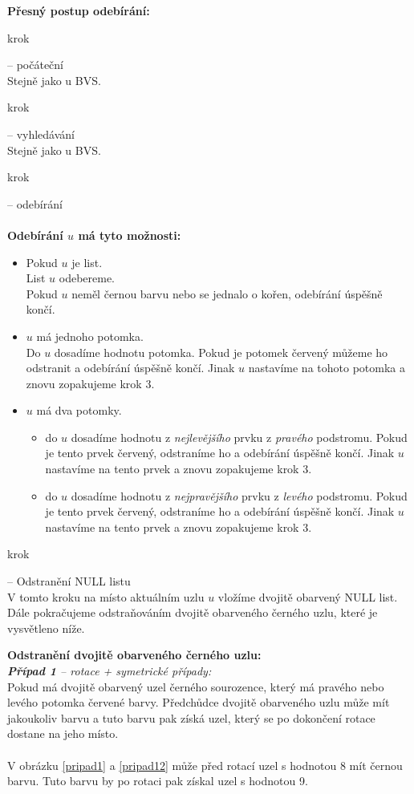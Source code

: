 \documentclass[
  biblatex=false,
  font=serif,
  glossaries=false,
  tables=false,
  theorems=false,
  index
]{kidiplom}
\begin{document}
\noindent \textbf{Přesný postup odebírání:}
\begin{enumerate} {\bfseries
\item  krok} -- počáteční \\
Stejně jako u BVS.
{\bfseries\item  krok} -- vyhledávání \\
Stejně jako u BVS.
{\bfseries\item  krok} -- odebírání \\\\
\textbf{Odebírání $u$ má tyto možnosti:}
\begin{itemize}
\item Pokud $u$ je list. \\
List $u$ odebereme.\\
Pokud $u$ neměl černou barvu nebo se jednalo o kořen, odebírání úspěšně končí.
\item $u$ má jednoho potomka. \\
Do $u$ dosadíme hodnotu potomka. Pokud je potomek červený můžeme ho odstranit a odebírání úspěšně končí. Jinak $u$ nastavíme na tohoto potomka a znovu zopakujeme krok 3.
\item $u$ má dva potomky. 
\begin{itemize}
\item do $u$ dosadíme hodnotu z \textit{nejlevějšího} prvku z \textit{pravého} podstromu. Pokud je tento prvek červený, odstraníme ho a odebírání úspěšně končí. Jinak $u$ nastavíme na tento prvek a znovu zopakujeme krok 3.
\item do $u$ dosadíme hodnotu z \textit{nejpravějšího} prvku z \textit{levého} podstromu. Pokud je tento prvek červený, odstraníme ho a odebírání úspěšně končí. Jinak $u$ nastavíme na tento prvek a znovu zopakujeme krok 3.
\end{itemize}
\end{itemize}
{\bfseries\item  krok} -- Odstranění NULL listu \\
V tomto kroku na místo aktuálním uzlu $u$ vložíme dvojitě obarvený NULL list. Dále pokračujeme odstraňováním dvojitě obarveného černého uzlu, které je vysvětleno níže.
\end{enumerate}

\newpage
\noindent \textbf{Odstranění dvojitě obarveného černého uzlu:}\\

\noindent \textit{\textbf{Případ 1} -- rotace + symetrické případy:}\\
Pokud má dvojitě obarvený uzel černého sourozence, který má pravého nebo levého potomka červené barvy. Předchůdce dvojitě obarveného uzlu může mít jakoukoliv barvu a tuto barvu pak získá uzel, který se po dokončení rotace dostane na jeho místo.\\\\
V obrázku \ref{pripad1} a \ref{pripad12} může před rotací uzel s hodnotou 8 mít černou barvu. Tuto barvu by po rotaci pak získal uzel s hodnotou 9.
\end{document}
